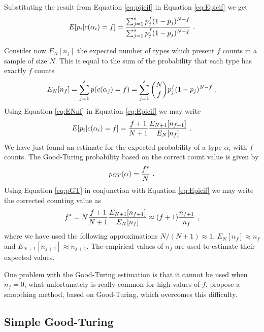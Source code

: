 Substituting the result from Equation \ref{eq:pijcif} in Equation \ref{eq:Epicif} we get
\begin{equation}
\label{eq:Epicif}
E[p_i | c(\alpha_i) = f] = \frac{ \sum_{j=1}^{s} p_j^f (1-p_j)^{N-f} }{ \sum_{j=1}^{s} p_j^f (1-p_j)^{N-f} } \textmd{ .}
\end{equation} 

Consider now $E_N [n_f]$ the expected number of types which present $f$ counts in a sample of size $N$.
This is equal to the sum of the probability that each type has exactly $f$ counts
\begin{equation}
\label{eq:ENnf}
E_N [n_f] = \sum_{j=1}^{s} p( c(\alpha_j) = f ) = \sum_{j=1}^{s} {N \choose f} p_j^f (1-p_j)^{N-f} \textmd{ .}
\end{equation}
Using Equation \ref{eq:ENnf} in Equation \ref{eq:Epicif} we may write
\begin{equation}
\label{eq:Epicif}
E[p_i | c(\alpha_i) = f] = \frac{f+1}{N+1} \frac{E_{N+1} [n_{f+1}]}{E_N [n_f]} \textmd{ .}
\end{equation}
We have just found an estimate for the expected probability of a type $\alpha_i$ with $f$ counts.
The Good-Turing probability based on the correct count value is given by
\begin{equation}
\label{eq:pGT}
p_{GT} (\alpha) = \frac{f^\ast}{N} \textmd{ .}
\end{equation}
Using Equation \ref{eq:pGT} in conjunction with Equation \ref{eq:Epicif} we may write the corrected 
counting value as
\begin{equation}
\label{eq:fastNf1N1}
f^\ast = N \frac{f+1}{N+1} \frac{E_{N+1} [n_{f+1}]}{E_N [n_f]} \approx (f+1) \frac{n_{f+1}}{n_f} \textmd{ ,}
\end{equation}
where we have used the following approximations $N/(N+1) \approx 1$, $E_N [n_f] \approx n_f$ and
$E_{N+1} [n_{f+1}] \approx n_{f+1}$. The empirical values of $n_f$ are used to estimate their expected values.

One problem with the Good-Turing estimation is that it cannot be used when $n_f = 0$, what unfortunately
is really common for high values of $f$. \cite{galesampson95} propose a smoothing method, based on
Good-Turing, which overcomes this difficulty.


\subsection{Simple Good-Turing}

